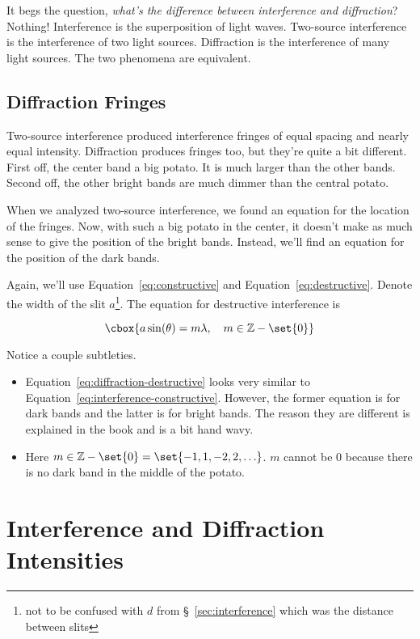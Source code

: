 \documentclass{hw}
\numberwithin{equation}{section}
\begin{document}
It begs the question, \emph{what's the difference between interference and
diffraction}? Nothing! Interference is the superposition of light waves.
Two-source interference is the interference of two light sources. Diffraction
is the interference of many light sources. The two phenomena are equivalent.  

\subsection{Diffraction Fringes}
Two-source interference produced interference fringes of equal spacing and
nearly equal intensity. Diffraction produces fringes too, but they're quite a
bit different. First off, the center band a big potato. It is much larger than
the other bands. Second off, the other bright bands are much dimmer than the
central potato. 

When we analyzed two-source interference, we found an equation for the location
of the fringes. Now, with such a big potato in the center, it doesn't make as
much sense to give the position of the bright bands. Instead, we'll find an
equation for the position of the dark bands.

Again, we'll use Equation~\ref{eq:constructive} and
Equation~\ref{eq:destructive}. Denote the width of the slit $a$\footnote{not to
be confused with $d$ from \S~\ref{sec:interference} which was the distance
between slits}. The equation for destructive interference is

\begin{equation}\label{eq:diffraction-destructive}
  \cbox{a \sin(\theta) = m \lambda, \quad m \in \mathbb{Z} - \set{0}}
\end{equation}

Notice a couple subtleties.
\begin{itemize}
  \item Equation~\ref{eq:diffraction-destructive} looks very similar to
    Equation~\ref{eq:interference-constructive}. However, the former equation
    is for dark bands and the latter is for bright bands. The reason they are
    different is explained in the book and is a bit hand wavy.
  \item Here $m \in \mathbb{Z} - \set{0} = \set{-1, 1, -2, 2, \ldots}$. $m$
    cannot be $0$ because there is no dark band in the middle of the potato.
\end{itemize}

\section{Interference and Diffraction Intensities}
\end{document}
